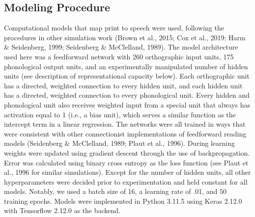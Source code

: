 \documentclass[
  ,man,floatsintext]{apa6}
\begin{document}
\hypertarget{modeling-procedure}{%
\subsection{Modeling Procedure}\label{modeling-procedure}}

Computational models that map print to speech were used, following the procedures in other simulation work (Brown et al., 2015; Cox et al., 2019; Harm \& Seidenberg, 1999; Seidenberg \& McClelland, 1989). The model architecture used here was a feedforward network with 260 orthographic input units, 175 phonological output units, and an experimentally manipulated number of hidden units (see description of representational capacity below). Each orthographic unit has a directed, weighted connection to every hidden unit, and each hidden unit has a directed, weighted connection to every phonological unit. Every hidden and phonological unit also receives weighted input from a special unit that always has activation equal to 1 (i.e., a bias unit), which serves a similar function as the intercept term in a linear regression. The networks were all trained in ways that were consistent with other connectionist implementations of feedforward reading models (Seidenberg \& McClelland, 1989; Plaut et al., 1996). During learning weights were updated using gradient descent through the use of backpropagation. Error was calculated using binary cross entropy as the loss function (see Plaut et al., 1996 for similar simulations). Except for the number of hidden units, all other hyperparameters were decided prior to experimentation and held constant for all models. Notably, we used a batch size of 16, a learning rate of .01, and 50 training epochs. Models were implemented in Python 3.11.5 using Keras 2.12.0 with Tensorflow 2.12.0 as the backend.
\end{document}
